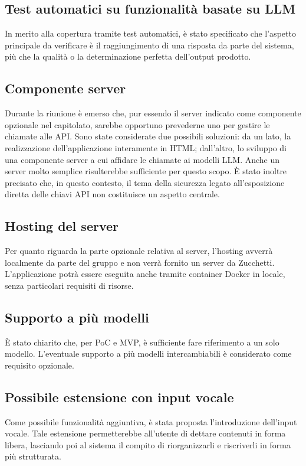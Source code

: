 \documentclass[a4paper, 10pt, colorlinks=true, linkcolor=black, urlcolor=blue, citecolor=blue, hidelinks]{article}
\begin{document}
\subsection{Test automatici su funzionalità basate su LLM}
In merito alla copertura tramite test automatici, è stato specificato che l'aspetto principale da verificare è il raggiungimento di una risposta da parte del sistema, più che la qualità o la determinazione perfetta dell'output prodotto.

\subsection{Componente server}
Durante la riunione è emerso che, pur essendo il server indicato come componente opzionale nel capitolato, sarebbe opportuno prevederne uno per gestire le chiamate alle API. Sono state considerate due possibili soluzioni: da un lato, la realizzazione dell'applicazione interamente in HTML; dall'altro, lo sviluppo di una componente server a cui affidare le chiamate ai modelli LLM. Anche un server molto semplice risulterebbe sufficiente per questo scopo. È stato inoltre precisato che, in questo contesto, il tema della sicurezza legato all'esposizione diretta delle chiavi API non costituisce un aspetto centrale.

\subsection{Hosting del server}
Per quanto riguarda la parte opzionale relativa al server, l'hosting avverrà localmente da parte del gruppo e non verrà fornito un server da Zucchetti. L'applicazione potrà essere eseguita anche tramite container Docker in locale, senza particolari requisiti di risorse.

\subsection{Supporto a più modelli}
È stato chiarito che, per PoC e MVP, è sufficiente fare riferimento a un solo modello. L'eventuale supporto a più modelli intercambiabili è considerato come requisito opzionale.

\subsection{Possibile estensione con input vocale}
Come possibile funzionalità aggiuntiva, è stata proposta l'introduzione dell'input vocale. Tale estensione permetterebbe all'utente di dettare contenuti in forma libera, lasciando poi al sistema il compito di riorganizzarli e riscriverli in forma più strutturata.
\end{document}
